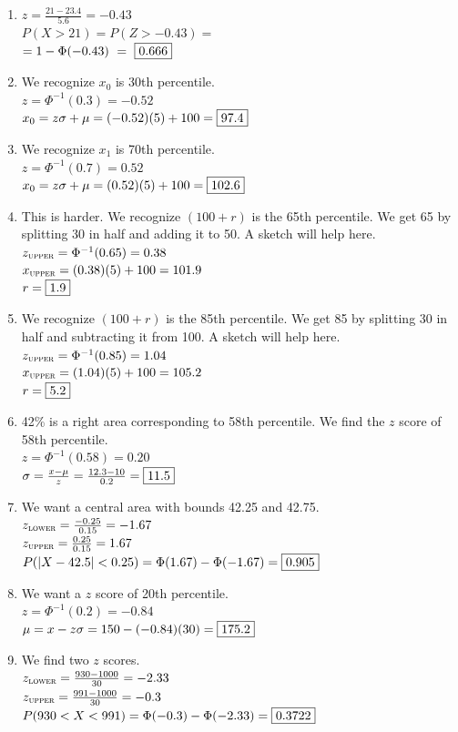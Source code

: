 \documentclass[12pt,letterpaper]{article}
\begin{document}
\begin{multicols}{2}
\begin{enumerate}
\item $z = \frac{21-23.4}{5.6} = -0.43$\\
$P(X>21) = P(Z>-0.43)=$\\ 
$= 1-\Phi(-0.43) ~=~ \fbox{0.666}$

\item We recognize $x_0$ is 30th percentile. \\
$z = \Phi^{-1}(0.3) = -0.52$\\
$x_0 = z\sigma+\mu = (-0.52)(5)+100 = \fbox{97.4}$

\item We recognize $x_1$ is 70th percentile. \\
$z = \Phi^{-1}(0.7) = 0.52$\\
$x_0 = z\sigma+\mu = (0.52)(5)+100 = \fbox{102.6}$

\item This is harder. We recognize $(100+r)$ is the 65th percentile. We get 65 by splitting 30 in half and adding it to 50. A sketch will help here. \\
$z_{\textsc{upper}} = \Phi^{-1}(0.65) = 0.38$\\
$x_{\textsc{upper}} = (0.38)(5)+100 = 101.9$\\
$r = \fbox{1.9}$

\item We recognize $(100+r)$ is the 85th percentile. We get 85 by splitting 30 in half and subtracting it from 100. A sketch will help here. \\
$z_{\textsc{upper}} = \Phi^{-1}(0.85) = 1.04$\\
$x_{\textsc{upper}} = (1.04)(5)+100 = 105.2$\\
$r = \fbox{5.2}$

\item 42\% is a right area corresponding to 58th percentile. We find the $z$ score of 58th percentile.\\
$z = \Phi^{-1}(0.58) = 0.20 $\\
$\sigma = \frac{x-\mu}{z} =\frac{12.3-10}{0.2} = \fbox{11.5}$

\item We want a central area with bounds 42.25 and 42.75.\\
$z_{\textsc{lower}} = \frac{-0.25}{0.15} = -1.67$ \\
$z_{\textsc{upper}} = \frac{0.25}{0.15} = 1.67$ \\
$P(|X-42.5|<0.25) = \Phi(1.67)-\Phi(-1.67) = \fbox{0.905}$

\item We want a $z$ score of 20th percentile.\\
$z = \Phi^{-1}(0.2) = -0.84$ \\
$\mu = x - z\sigma = 150-(-0.84)(30) = \fbox{175.2}$

\item We find two $z$ scores.\\
$z_{\textsc{lower}} = \frac{930-1000}{30} = -2.33$\\
$z_{\textsc{upper}} = \frac{991-1000}{30} = -0.3$ \\
$P(930<X<991) = \Phi(-0.3)-\Phi(-2.33) = \fbox{0.3722}$

\end{enumerate}
\end{multicols}
\end{document}
